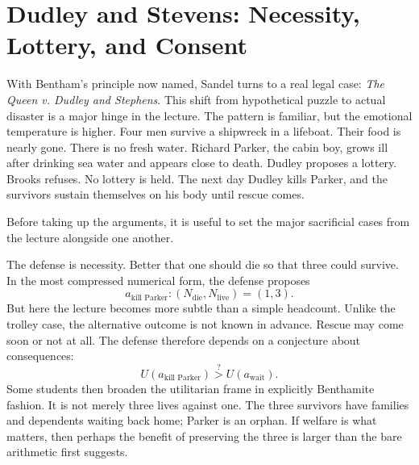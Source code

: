 \section{Dudley and Stevens: Necessity, Lottery, and Consent}

With Bentham's principle now named, Sandel turns to a real legal case: \emph{The Queen v. Dudley and Stephens}. This shift from hypothetical puzzle to actual disaster is a major hinge in the lecture. The pattern is familiar, but the emotional temperature is higher. Four men survive a shipwreck in a lifeboat. Their food is nearly gone. There is no fresh water. Richard Parker, the cabin boy, grows ill after drinking sea water and appears close to death. Dudley proposes a lottery. Brooks refuses. No lottery is held. The next day Dudley kills Parker, and the survivors sustain themselves on his body until rescue comes.

Before taking up the arguments, it is useful to set the major sacrificial cases from the lecture alongside one another.

\begin{table}[h]
\centering
{}
\end{table}

The defense is necessity. Better that one should die so that three could survive. In the most compressed numerical form, the defense proposes
\begin{equation}
a_{\text{kill Parker}} : (N_{\text{die}},N_{\text{live}}) = (1,3).
\end{equation}
But here the lecture becomes more subtle than a simple headcount. Unlike the trolley case, the alternative outcome is not known in advance. Rescue may come soon or not at all. The defense therefore depends on a conjecture about consequences:
\begin{equation}
U(a_{\text{kill Parker}}) \stackrel{?}{>} U(a_{\text{wait}}).
\end{equation}
Some students then broaden the utilitarian frame in explicitly Benthamite fashion. It is not merely three lives against one. The three survivors have families and dependents waiting back home; Parker is an orphan. If welfare is what matters, then perhaps the benefit of preserving the three is larger than the bare arithmetic first suggests.


